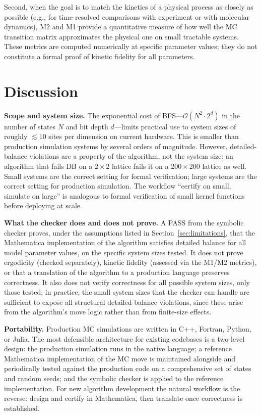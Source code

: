 \documentclass[twocolumn,10pt]{article}
\begin{document}
Second, when the goal is to match the kinetics of a physical process as
closely as possible (e.g., for time-resolved comparisons with experiment or
with molecular dynamics), M2 and M1 provide a quantitative measure of how
well the MC transition matrix approximates the physical one on small tractable
systems.  These metrics are computed numerically at specific parameter values;
they do not constitute a formal proof of kinetic fidelity for all parameters.

\section{Discussion}
\label{sec:discussion}

\medskip\noindent\textbf{Scope and system size.}
The exponential cost of BFS---$\mathcal{O}(N^2\cdot 2^d)$ in the number of
states $N$ and bit depth $d$---limits practical use to system sizes of roughly
$\lesssim\!10$ sites per dimension on current hardware.  This is smaller than
production simulation systems by several orders of magnitude.  However,
detailed-balance violations are a property of the algorithm, not the system
size: an algorithm that fails DB on a $2\times2$ lattice fails it on a
$200\times200$ lattice as well.  Small systems are the correct setting for
formal verification; large systems are the correct setting for production
simulation.  The workflow ``certify on small, simulate on large'' is
analogous to formal verification of small kernel functions before deploying
at scale.

\medskip\noindent\textbf{What the checker does and does not prove.}
A PASS from the symbolic checker proves, under the assumptions listed in
Section~\ref{sec:limitations}, that the Mathematica implementation of the
algorithm satisfies detailed balance for all model parameter values, on the
specific system sizes tested.  It does not prove ergodicity (checked
separately), kinetic fidelity (assessed via the M1/M2 metrics), or that a
translation of the algorithm to a production language preserves correctness.
It also does not verify correctness for all possible system sizes, only those
tested; in practice, the small system sizes that the checker can handle are
sufficient to expose all structural detailed-balance violations, since these
arise from the algorithm's move logic rather than from finite-size effects.

\medskip\noindent\textbf{Portability.}
Production MC simulations are written in C++, Fortran, Python, or Julia.
The most defensible architecture for existing codebases is a two-level
design: the production simulation runs in the native language; a reference
Mathematica implementation of the MC move is maintained alongside and
periodically tested against the production code on a comprehensive set of
states and random seeds; and the symbolic checker is applied to the reference
implementation.  For new algorithm development the natural workflow is the
reverse: design and certify in Mathematica, then translate once correctness
is established.
\end{document}
